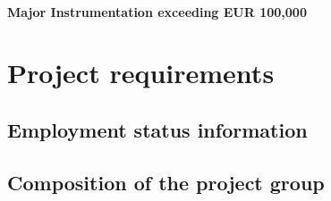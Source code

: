 \documentclass[10pt,fleqn,twoside]{article}
\begin{document}
\paragraph{Major Instrumentation exceeding EUR 100,000} 

\todo{[Text]}

% 
% 
% 
% 
% 
% 
% 

\section{Project requirements}
\renewcommand{\leftmark}{\sc Project requirements}

\subsection{Employment status information}

\todo{[Text]}

%

\subsection{Composition of the project group}
\end{document}
